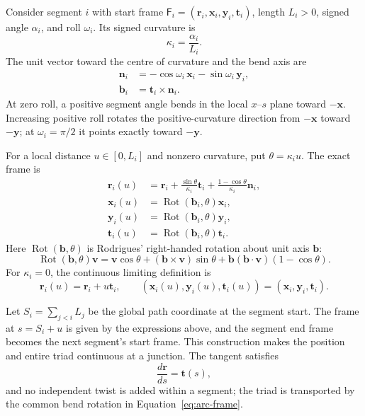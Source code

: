 \documentclass[11pt,a4paper]{article}
\newcommand{\Frame}{\mathsf{F}}
\newcommand{\Rot}{\operatorname{Rot}}
\begin{document}
Consider segment $i$ with start frame
$\Frame_i=(\mathbf{r}_i,\mathbf{x}_i,\mathbf{y}_i,\mathbf{t}_i)$,
length $L_i>0$, signed angle $\alpha_i$, and roll $\omega_i$.  Its signed
curvature is
\begin{equation}
  \kappa_i=\frac{\alpha_i}{L_i}.
\end{equation}
The unit vector toward the centre of curvature and the bend axis are
\begin{align}
  \mathbf{n}_i
    &=-\cos\omega_i\,\mathbf{x}_i-
      \sin\omega_i\,\mathbf{y}_i,\\
  \mathbf{b}_i&=\mathbf{t}_i\times\mathbf{n}_i.
  \label{eq:bend-plane}
\end{align}
At zero roll, a positive segment angle bends in the local $x$--$s$ plane
toward $-\mathbf{x}$.  Increasing positive roll rotates the positive-curvature
direction from $-\mathbf{x}$ toward $-\mathbf{y}$; at $\omega_i=\pi/2$ it
points exactly toward $-\mathbf{y}$.

For a local distance $u\in[0,L_i]$ and nonzero curvature, put
$\theta=\kappa_i u$.  The exact frame is
\begin{align}
  \mathbf{r}_i(u)
    &=\mathbf{r}_i
      +\frac{\sin\theta}{\kappa_i}\mathbf{t}_i
      +\frac{1-\cos\theta}{\kappa_i}\mathbf{n}_i,
      \label{eq:arc-position}\\
  \mathbf{x}_i(u)&=\Rot(\mathbf{b}_i,\theta)\mathbf{x}_i,\\
  \mathbf{y}_i(u)&=\Rot(\mathbf{b}_i,\theta)\mathbf{y}_i,\\
  \mathbf{t}_i(u)&=\Rot(\mathbf{b}_i,\theta)\mathbf{t}_i.
  \label{eq:arc-frame}
\end{align}
Here $\Rot(\mathbf{b},\theta)$ is Rodrigues' right-handed rotation about unit
axis $\mathbf{b}$:
\begin{equation}
 \Rot(\mathbf{b},\theta)\mathbf{v}
 =\mathbf{v}\cos\theta
  +(\mathbf{b}\times\mathbf{v})\sin\theta
  +\mathbf{b}(\mathbf{b}\cdot\mathbf{v})(1-\cos\theta).
\end{equation}
For $\kappa_i=0$, the continuous limiting definition is
\begin{equation}
  \mathbf{r}_i(u)=\mathbf{r}_i+u\mathbf{t}_i,
  \qquad
  (\mathbf{x}_i(u),\mathbf{y}_i(u),\mathbf{t}_i(u))
  =(\mathbf{x}_i,\mathbf{y}_i,\mathbf{t}_i).
  \label{eq:straight-segment}
\end{equation}

Let $S_i=\sum_{j<i}L_j$ be the global path coordinate at the segment start.
The frame at $s=S_i+u$ is given by the expressions above, and the segment end
frame becomes the next segment's start frame.  This construction makes the
position and entire triad continuous at a junction.  The tangent satisfies
\begin{equation}
  \frac{d\mathbf{r}}{ds}=\mathbf{t}(s),
\end{equation}
and no independent twist is added within a segment; the triad is transported by
the common bend rotation in Equation~\eqref{eq:arc-frame}.
\end{document}
